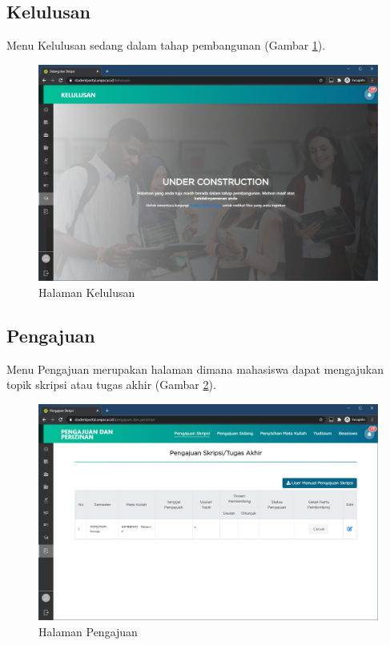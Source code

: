 \subsection{Kelulusan}
    Menu Kelulusan sedang dalam tahap pembangunan (Gambar \ref{fig:3_kelulusan}).
    \begin{figure}[H]
    	\centering
    	\includegraphics[scale=0.4]{Gambar/kelulusan.png}
    	\caption{Halaman Kelulusan} 
    	\label{fig:3_kelulusan}
    \end{figure}

\subsection{Pengajuan}
    Menu Pengajuan merupakan halaman dimana mahasiswa dapat mengajukan topik skripsi atau tugas akhir (Gambar \ref{fig:3_pengajuan}).
    \begin{figure}[H]
    	\centering
    	\includegraphics[scale=0.45]{Gambar/pengajuan.png}
    	\caption{Halaman Pengajuan} 
    	\label{fig:3_pengajuan}
    \end{figure}
    
